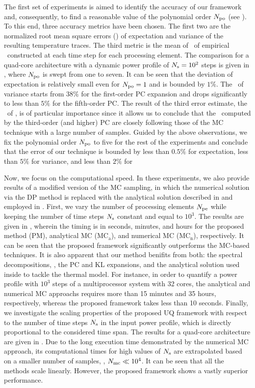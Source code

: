 
The first set of experiments is aimed to identify the accuracy of our framework and, consequently, to find a reasonable value of the polynomial order ${N_\text{po}}$ (see ). To this end, three accuracy metrics have been chosen. The first two are the normalized root mean square errors (\nrmse) of expectation and variance of the resulting temperature traces. The third metric is the mean of \nrmses\ of empirical \pdfs\ constructed at each time step for each processing element. The comparison for a quad-core architecture with a dynamic power profile of $N_\text{s} = 10^2$ steps is given in , where ${N_\text{po}}$ is swept from one to seven. It can be seen that the deviation of expectation is relatively small even for ${N_\text{po}} = 1$ and is bounded by $1\%$. The \nrmse\ of variance starts from $38\%$ for the first-order PC expansion and drops significantly to less than $5\%$ for the fifth-order PC. The result of the third error estimate, the \nrmse\ of \pdfs, is of particular importance since it allows us to conclude that the \pdfs\ computed by the third-order (and higher) PC are closely following those of the MC technique with a large number of samples. Guided by the above observations, we fix the polynomial order ${N_\text{po}}$ to five for the rest of the experiments and conclude that the error of our technique is bounded by less than $0.5\%$ for expectation, less than $5\%$ for variance, and less than $2\%$ for \pdf


Now, we focus on the computational speed. In these experiments, we also provide results of a modified version of the MC sampling, in which the numerical solution via the DP method is replaced with the analytical solution described in  and employed in . First, we vary the number of processing elements ${N_\text{pe}}$ while keeping the number of time steps $N_\text{s}$ constant and equal to $10^3$. The results are given in , wherein the timing is in seconds, minutes, and hours for the proposed method (PM), analytical MC ($\text{MC}_\text{a}$), and numerical MC ($\text{MC}_\text{n}$), respectively. It can be seen that the proposed framework significantly outperforms the MC-based techniques. It is also apparent that our method benifits from both: the spectral decompositions, \ie, the PC and KL expansions, and the analytical solution used inside to tackle the thermal model. For instance, in order to quantify a power profile with $10^3$ steps of a multiprocessor system with 32 cores, the analytical and numerical MC approachs requires more than 15 minutes and 35 hours, respectively, whereas the proposed framework takes less than 10 seconds. Finally, we investigate the scaling properties of the proposed UQ framework with respect to the number of time steps $N_\text{s}$ in the input power profile, which is directly proportional to the considered time span. The results for a quad-core architecture are given in . Due to the long execution time demonstrated by the numerical MC approach, its computational times for high values of $N_\text{s}$ are extrapolated based on a smaller number of samples, \ie, $N_\text{mc} \ll 10^4$. It can be seen that all the methods scale linearly. However, the proposed framework shows a vastly superior performance.
